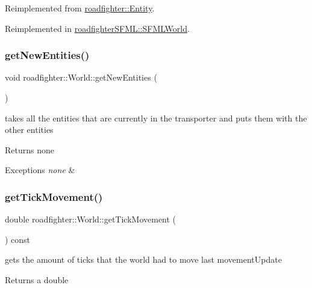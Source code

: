 Reimplemented from \hyperlink{classroadfighter_1_1Entity_a30caeaac440c67460ea311f9b1bf3552}{roadfighter\+::\+Entity}.



Reimplemented in \hyperlink{classroadfighterSFML_1_1SFMLWorld_ac65836bf9c104d4611f63e6640706713}{roadfighter\+S\+F\+M\+L\+::\+S\+F\+M\+L\+World}.

\mbox{\label{classroadfighter_1_1World_a8d20efd557fc36fdf6218c0fdedd0b5a}} 
\subsubsection{\texorpdfstring{get\+New\+Entities()}{getNewEntities()}}
{\footnotesize\ttfamily void roadfighter\+::\+World\+::get\+New\+Entities (\begin{DoxyParamCaption}{ }\end{DoxyParamCaption})}

takes all the entities that are currently in the transporter and puts them with the other entities \begin{DoxyReturn}{Returns}
none 
\end{DoxyReturn}

\begin{DoxyExceptions}{Exceptions}
{\em none} & \\
\hline
\end{DoxyExceptions}
\mbox{\label{classroadfighter_1_1World_a37fb93dcb90ec720a4ef17c43cf64dd4}} 
\subsubsection{\texorpdfstring{get\+Tick\+Movement()}{getTickMovement()}}
{\footnotesize\ttfamily double roadfighter\+::\+World\+::get\+Tick\+Movement (\begin{DoxyParamCaption}{ }\end{DoxyParamCaption}) const}

gets the amount of ticks that the world had to move last movement\+Update \begin{DoxyReturn}{Returns}
a double 
\end{DoxyReturn}

